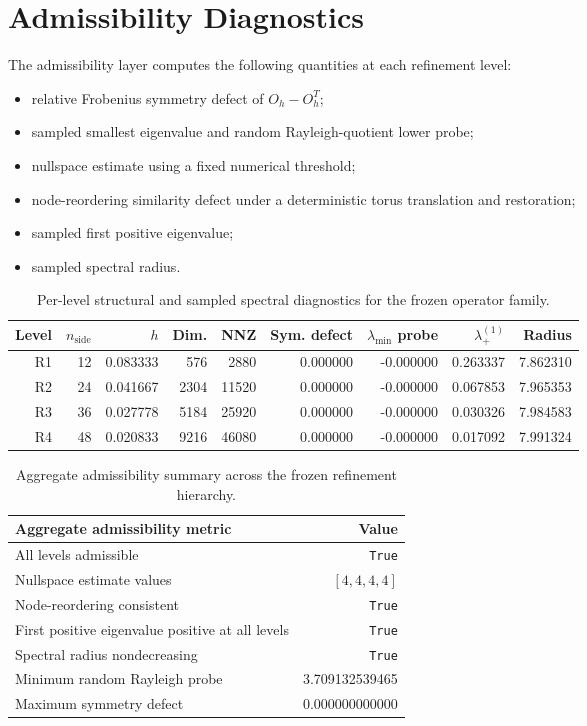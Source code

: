 \documentclass[11pt]{article}
\begin{document}
\section{Admissibility Diagnostics}

The admissibility layer computes the following quantities at each refinement level:
\begin{itemize}
\item relative Frobenius symmetry defect of $O_h - O_h^{T}$;
\item sampled smallest eigenvalue and random Rayleigh-quotient lower probe;
\item nullspace estimate using a fixed numerical threshold;
\item node-reordering similarity defect under a deterministic torus translation and restoration;
\item sampled first positive eigenvalue;
\item sampled spectral radius.
\end{itemize}

\begin{table}[t]
\centering
\small
\begin{tabular}{@{}rrrrrrrrr@{}}
\toprule
Level & $n_{\mathrm{side}}$ & $h$ & Dim. & NNZ & Sym. defect & $\lambda_{\min}$ probe & $\lambda_{+}^{(1)}$ & Radius \\
\midrule
R1 & 12 & 0.083333 & 576  & 2880  & 0.000000 & -0.000000 & 0.263337 & 7.862310 \\
R2 & 24 & 0.041667 & 2304 & 11520 & 0.000000 & -0.000000 & 0.067853 & 7.965353 \\
R3 & 36 & 0.027778 & 5184 & 25920 & 0.000000 & -0.000000 & 0.030326 & 7.984583 \\
R4 & 48 & 0.020833 & 9216 & 46080 & 0.000000 & -0.000000 & 0.017092 & 7.991324 \\
\bottomrule
\end{tabular}
\caption{Per-level structural and sampled spectral diagnostics for the frozen operator family.}
\label{tab:levels}
\end{table}

\begin{table}[t]
\centering
\small
\begin{tabular}{@{}lr@{}}
\toprule
Aggregate admissibility metric & Value \\
\midrule
All levels admissible & \texttt{True} \\
Nullspace estimate values & $[4,4,4,4]$ \\
Node-reordering consistent & \texttt{True} \\
First positive eigenvalue positive at all levels & \texttt{True} \\
Spectral radius nondecreasing & \texttt{True} \\
Minimum random Rayleigh probe & 3.709132539465 \\
Maximum symmetry defect & 0.000000000000 \\
\bottomrule
\end{tabular}
\caption{Aggregate admissibility summary across the frozen refinement hierarchy.}
\label{tab:aggregate}
\end{table}
\end{document}
